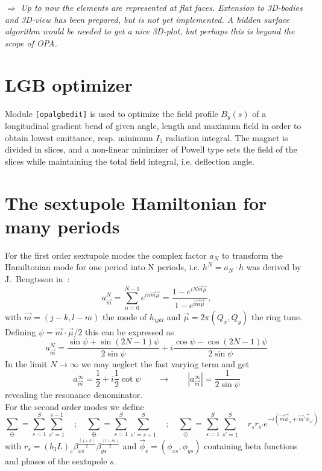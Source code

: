 \documentclass[12pt]{article}
\newcommand\beq{\begin{equation}}
\newcommand\eeq{\end{equation}}
\newcommand\todo[1]{$\Longrightarrow$ {\em #1} }
\newcommand\code[1]{{\tt [#1]}}
\begin{document}
\todo{Up to now the elements are represented at flat faces. Extension to 3D-bodies and 3D-view has been prepared, but is not yet implemented. A hidden surface algorithm would be needed to get a nice 3D-plot, but perhaps this is beyond the scope of OPA.}

\section{LGB optimizer}
Module \code{opalgbedit} is used to optimize the field profile $B_y(s)$ of a longitudinal gradient bend of given angle, length and maximum field in order to obtain lowest emittance, resp. minimum $I_5$ radiation integral. The magnet is divided in slices, and a non-linear minimizer of Powell type \cite{numrec} sets the field of the slices while maintaining the total field integral, i.e. deflection angle.



\newpage
\appendix


\section{\label{appsexham} The sextupole Hamiltonian for many periods}
For the first order sextupole modes the complex factor $a_N$ to transform the Hamiltonian
mode for one period into N periods, i.e. $h^N = a_N\cdot h$ was derived by J.~Bengtsson in~\cite{jbthesis}:
\beq
a^N_{\vec{m}}=\sum_{n=0}^{N-1}e^{i n \vec{m}\vec{\mu}} = \frac{1-e^{iN\vec{m}\vec{\mu}}}{1-e^{i\vec{m}\vec{\mu}}},
\eeq
with $\vec{m}=(j-k,l-m)$ the mode of $h_{ijkl}$ and $\vec\mu=2\pi(Q_x,Q_y)$ the ring tune.
Defining $\psi=\vec{m}\cdot\vec{\mu}/2$ this can be expressed as
\beq
a^N_{\vec{m}}=\frac{\sin\psi+\sin (2N-1)\psi}{2\sin\psi} + i \frac{\cos\psi-\cos (2N-1)\psi}{2\sin\psi}
\eeq
In the limit $N\rightarrow\infty$ we may neglect the fast varying term and get
\beq
a^{\infty}_{\vec{m}}=\frac{1}{2}+i\frac{1}{2}\cot\psi \qquad
\longrightarrow\qquad |a^{\infty}_{\vec{m}}|=\frac{1}{2\sin\psi}
\eeq
revealing the resonance denominator.\\

For the second order modes we define
\beq
\sum_{\ominus} = \sum_{s=1}^{S}\sum_{s'=1}^{s-1}\quad;\quad
\sum_{\oplus} = \sum_{s=1}^{S}\sum_{s'=s+1}^{S}\quad ;\quad
\sum_{\odot} = \sum_{s=1}^{S}\sum_{s'=1}^{S} \quad r_s r_{s'}
e^{-i(\vec{m}\vec{\phi}_s+\vec{m}'\vec{\phi}_{s'})}
\eeq
with $r_s=(b_3L)_s \beta_{xs}^{\frac{(j+k)}{2}} \beta_{ys}^{\frac{(l+m)}{2}}$ and $\vec{\phi}_s=(\phi_{xs}, \phi_{ys})$
containing beta functions and phases of the sextupole $s$.
\end{document}

